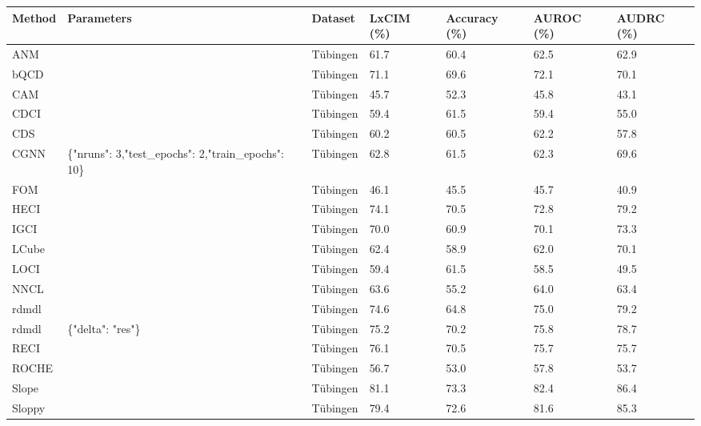 \begin{tabular}{lllllll}
\toprule
Method & Parameters & Dataset & LxCIM (\%) & Accuracy (\%) & AUROC (\%) & AUDRC (\%) \\
\midrule
ANM &  & Tübingen & 61.7 & 60.4 & 62.5 & 62.9 \\
bQCD &  & Tübingen & 71.1 & 69.6 & 72.1 & 70.1 \\
CAM &  & Tübingen & 45.7 & 52.3 & 45.8 & 43.1 \\
CDCI &  & Tübingen & 59.4 & 61.5 & 59.4 & 55.0 \\
CDS &  & Tübingen & 60.2 & 60.5 & 62.2 & 57.8 \\
CGNN & \{"nruns": 3,"test\_epochs": 2,"train\_epochs": 10\} & Tübingen & 62.8 & 61.5 & 62.3 & 69.6 \\
FOM &  & Tübingen & 46.1 & 45.5 & 45.7 & 40.9 \\
HECI &  & Tübingen & 74.1 & 70.5 & 72.8 & 79.2 \\
IGCI &  & Tübingen & 70.0 & 60.9 & 70.1 & 73.3 \\
LCube &  & Tübingen & 62.4 & 58.9 & 62.0 & 70.1 \\
LOCI &  & Tübingen & 59.4 & 61.5 & 58.5 & 49.5 \\
NNCL &  & Tübingen & 63.6 & 55.2 & 64.0 & 63.4 \\
rdmdl &  & Tübingen & 74.6 & 64.8 & 75.0 & 79.2 \\
rdmdl & \{"delta": "res"\} & Tübingen & 75.2 & 70.2 & 75.8 & 78.7 \\
RECI &  & Tübingen & 76.1 & 70.5 & 75.7 & 75.7 \\
ROCHE &  & Tübingen & 56.7 & 53.0 & 57.8 & 53.7 \\
Slope &  & Tübingen & 81.1 & 73.3 & 82.4 & 86.4 \\
Sloppy &  & Tübingen & 79.4 & 72.6 & 81.6 & 85.3 \\
\bottomrule
\end{tabular}
